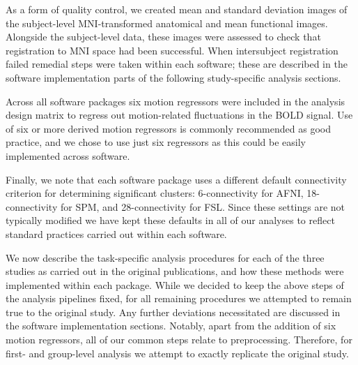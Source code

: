 As a form of quality control, we created mean and standard deviation images of the subject-level MNI-transformed anatomical and mean functional images. Alongside the subject-level data, these images were assessed to check that registration to MNI space had been successful. When intersubject registration failed remedial steps were taken within each software; these are described in the software implementation parts of the following study-specific analysis sections. 

Across all software packages six motion regressors were included in the analysis design matrix to regress out motion-related fluctuations in the BOLD signal. Use of six or more derived motion regressors is commonly recommended as good practice, and we chose to use just six regressors as this could be easily implemented across software. 

Finally, we note that each software package uses a different default connectivity criterion for determining significant clusters: 6-connectivity for AFNI, 18-connectivity for SPM, and 28-connectivity for FSL. Since these settings are not typically modified we have kept these defaults in all of our analyses to reflect standard practices carried out within each software. 

We now describe the task-specific analysis procedures for each of the three studies as carried out in the original publications, and how these methods were implemented within each package. While we decided to keep the above steps of the analysis pipelines fixed, for all remaining procedures we attempted to remain true to the original study. Any further deviations necessitated are discussed in the software implementation sections. Notably, apart from the addition of six motion regressors, all of our common steps relate to preprocessing. Therefore, for first- and group-level analysis we attempt to exactly replicate the original study. 

